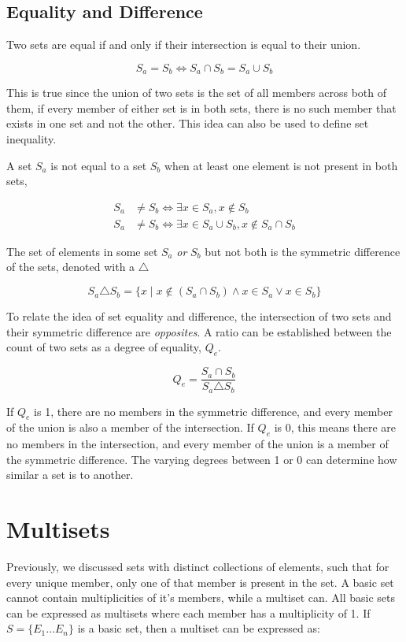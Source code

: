 \subsection{Equality and Difference}

Two sets are equal if and only if their intersection is equal to their union.

$$
S_a = S_b \iff S_a \cap S_b = S_a \cup S_b
$$

This is true since the union of two sets is the set of all members across both of them, if every member of either set is in both sets, there is no such member that exists in one set and not the other. This idea can also be used to define set inequality. 

A set $S_a$ is not equal to a set $S_b$ when at least one element is not present in both sets,

\begin{align}
S_a &\neq S_b \iff \exists x \in S_a, x \notin S_b \\
S_a &\neq S_b \iff \exists x \in S_a \cup S_b, x \notin S_a \cap S_b
\end{align}

The set of elements in some set $S_a$ \textit{or} $S_b$ but not both is the symmetric difference of the sets, denoted with a $\triangle$

$$
S_a \triangle S_b = \{ x \mid x \notin (S_a \cap S_b) \land x \in S_a \lor x \in S_b  \}
$$

To relate the idea of set equality and difference, the intersection of two sets and their symmetric difference are \textit{opposites}. A ratio can be established between the count of two sets as a degree of equality, $Q_e$.

$$
Q_e = \frac{S_a \cap S_b}{S_a \triangle S_b}
$$ 

If $Q_e$ is 1, there are no members in the symmetric difference, and every member of the union is also a member of the intersection. If $Q_e$ is 0, this means there are no members in the intersection, and every member of the union is a member of the symmetric difference. The varying degrees between 1 or 0 can determine how similar a set is to another.

\section{Multisets}

Previously, we discussed sets with distinct collections of elements, such that for every unique member, only one of that member is present in the set. A basic set cannot contain multiplicities of it's members, while a multiset can. All basic sets can be expressed as multisets where each member has a multiplicity of 1. If $S = \{E_1 \dots E_n\}$ is a basic set, then a multiset can be expressed as:


